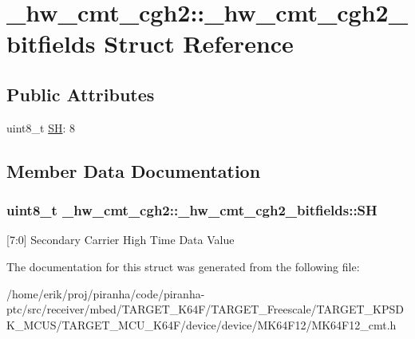 \hypertarget{struct__hw__cmt__cgh2_1_1__hw__cmt__cgh2__bitfields}{}\section{\+\_\+hw\+\_\+cmt\+\_\+cgh2\+:\+:\+\_\+hw\+\_\+cmt\+\_\+cgh2\+\_\+bitfields Struct Reference}
\label{struct__hw__cmt__cgh2_1_1__hw__cmt__cgh2__bitfields}
\subsection*{Public Attributes}
\begin{DoxyCompactItemize}
\item 
uint8\+\_\+t \hyperlink{struct__hw__cmt__cgh2_1_1__hw__cmt__cgh2__bitfields_aa2a207763abc4350f2e6deac03d07dbf}{SH}\+: 8
\end{DoxyCompactItemize}


\subsection{Member Data Documentation}
\subsubsection[{\texorpdfstring{SH}{SH}}]{\setlength{\rightskip}{0pt plus 5cm}uint8\+\_\+t \+\_\+hw\+\_\+cmt\+\_\+cgh2\+::\+\_\+hw\+\_\+cmt\+\_\+cgh2\+\_\+bitfields\+::\+SH}\hypertarget{struct__hw__cmt__cgh2_1_1__hw__cmt__cgh2__bitfields_aa2a207763abc4350f2e6deac03d07dbf}{}\label{struct__hw__cmt__cgh2_1_1__hw__cmt__cgh2__bitfields_aa2a207763abc4350f2e6deac03d07dbf}
\mbox{[}7\+:0\mbox{]} Secondary Carrier High Time Data Value 

The documentation for this struct was generated from the following file\+:\begin{DoxyCompactItemize}
\item 
/home/erik/proj/piranha/code/piranha-\/ptc/src/receiver/mbed/\+T\+A\+R\+G\+E\+T\+\_\+\+K64\+F/\+T\+A\+R\+G\+E\+T\+\_\+\+Freescale/\+T\+A\+R\+G\+E\+T\+\_\+\+K\+P\+S\+D\+K\+\_\+\+M\+C\+U\+S/\+T\+A\+R\+G\+E\+T\+\_\+\+M\+C\+U\+\_\+\+K64\+F/device/device/\+M\+K64\+F12/M\+K64\+F12\+\_\+cmt.\+h\end{DoxyCompactItemize}
